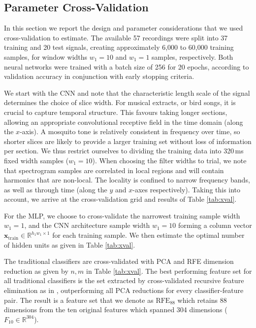 \documentclass[10pt, twocolumn]{llncs}
\begin{document}
\subsection{Parameter Cross-Validation}
\label{subsec:xvalparams}
In this section we report the design and parameter considerations that we used cross-validation to estimate. The available 57 recordings were split into 37 training and 20 test signals, creating approximately 6,000 to 60,000 training samples, for window widths $w_1 = 10$ and $w_1 = 1$ samples, respectively. Both neural networks were trained with a batch size of 256 for 20 epochs, according to validation accuracy in conjunction with early stopping criteria.

We start with the CNN and note that the characteristic length scale of the signal determines the choice of slice width. For musical extracts, or bird songs, it is crucial to capture temporal structure. This favours taking longer sections, allowing an appropriate convolutional receptive field in the time domain (along the $x$-axis). A mosquito tone is relatively consistent in frequency over time, so shorter slices are likely to provide a larger training set without loss of information per section. We thus restrict ourselves to dividing the training data into 320\,ms fixed width samples ($w_1 = 10$). When choosing the filter widths to trial, we note that spectrogram samples are correlated in local regions and will contain harmonics that are non-local. The locality is confined to narrow frequency bands, as well as through time (along the $y$ and $x$-axes respectively). Taking this into account, we arrive at the cross-validation grid and results of Table \ref{tab:xval}.

For the MLP, we choose to cross-validate the narrowest training sample width $w_1 = 1$, and the CNN architecture sample width $w_1 = 10$ forming a column vector $\mathbf{x}_\mathrm{train} \in \mathbb{R}^{h_1  w_1 \times 1}$ for each training sample.
We then estimate the optimal number of hidden units as given in Table \ref{tab:xval}.

The traditional classifiers are cross-validated with PCA and RFE dimension reduction as given by $n, m$ in Table \ref{tab:xval}. The best performing feature set for all traditional classifiers is the set extracted by cross-validated recursive feature elimination as in \cite{guyon2002gene}, outperforming all PCA reductions for every classifier-feature pair. The result is a feature set that we denote as $\text{RFE}_{88}$ which retains 88 dimensions from the ten original features which spanned 304 dimensions ($F_{10}  \in \mathbb{R}^{304} $).
\end{document}
